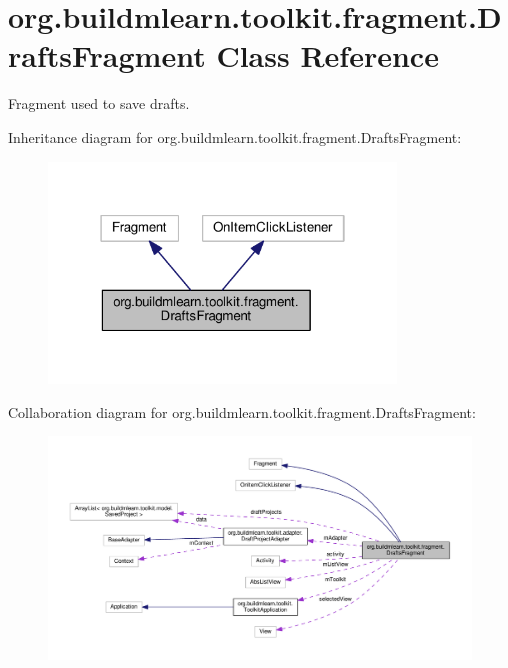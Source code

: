 \hypertarget{classorg_1_1buildmlearn_1_1toolkit_1_1fragment_1_1DraftsFragment}{}\section{org.\+buildmlearn.\+toolkit.\+fragment.\+Drafts\+Fragment Class Reference}
\label{classorg_1_1buildmlearn_1_1toolkit_1_1fragment_1_1DraftsFragment}


Fragment used to save drafts.  




Inheritance diagram for org.\+buildmlearn.\+toolkit.\+fragment.\+Drafts\+Fragment\+:
\nopagebreak
\begin{figure}[H]
\begin{center}
\leavevmode
\includegraphics[width=262pt]{classorg_1_1buildmlearn_1_1toolkit_1_1fragment_1_1DraftsFragment__inherit__graph}
\end{center}
\end{figure}


Collaboration diagram for org.\+buildmlearn.\+toolkit.\+fragment.\+Drafts\+Fragment\+:
\nopagebreak
\begin{figure}[H]
\begin{center}
\leavevmode
\includegraphics[width=350pt]{classorg_1_1buildmlearn_1_1toolkit_1_1fragment_1_1DraftsFragment__coll__graph}
\end{center}
\end{figure}
